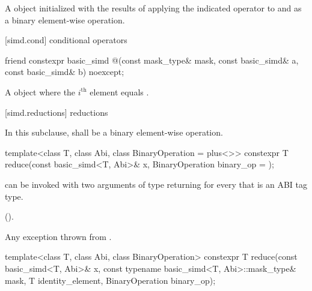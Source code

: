 \begin{itemdescr}
  \pnum\ConstraintOperatorTWellFormed

  \pnum\returns
  A  object initialized with the results of applying the indicated operator to  and  as a binary element-wise operation.
\end{itemdescr}

[simd.cond]{ conditional operators}

\begin{itemdecl}
friend constexpr basic_simd
@\simdselect@(const mask_type& mask, const basic_simd& a, const basic_simd& b) noexcept;
\end{itemdecl}

\begin{itemdescr}
  \pnum\returns
  A  object where the $i^\text{th}$ element equals  \foralli.
\end{itemdescr}

[simd.reductions]{ reductions}

\pnum
In this subclause,  shall be a binary element-wise operation.

\begin{itemdecl}
template<class T, class Abi, class BinaryOperation = plus<>>
  constexpr T reduce(const basic_simd<T, Abi>& x, BinaryOperation binary_op = {});
\end{itemdecl}

\begin{itemdescr}
  \pnum\mandates
   can be invoked with two arguments of type  returning  for every  that is an ABI tag type.

  \pnum\returns
   \foralli ().

  \pnum\throws
  Any exception thrown from .
\end{itemdescr}

\begin{itemdecl}
template<class T, class Abi, class BinaryOperation>
  constexpr T reduce(const basic_simd<T, Abi>& x, const typename basic_simd<T, Abi>::mask_type& mask,
                     T identity_element, BinaryOperation binary_op);
\end{itemdecl}

